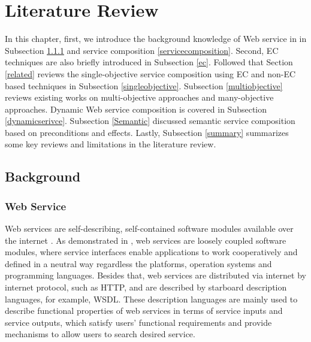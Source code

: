 \chapter{Literature Review}\label{C:review}
In this chapter, first, we introduce the background knowledge of Web service in in Subsection \ref{service} and service composition \ref{servicecomposition}. Second, EC techniques are also briefly introduced in Subsection \ref{ec}. Followed that Section \ref{related} reviews the single-objective service composition using EC and non-EC based techniques in Subsection \ref{singleobjective}.  Subsection  \ref{multiobjective} reviews existing works on multi-objective approaches and many-objective approaches.  Dynamic Web service composition is covered in Subsection \ref{dynamicserivce}. Subsection \ref{Semantic}  discussed semantic service composition based on preconditions and effects. Lastly, Subsection \ref{summary} summarizes some key reviews and limitations in the literature review.
\section{Background}\label{background}
\subsection{Web Service}\label{service}

Web services are self-describing, self-contained software modules available over the internet \cite{erl2004service}. As demonstrated in \cite{erl2004service}, web services are loosely coupled software modules, where service interfaces enable applications to work cooperatively and defined in a neutral way regardless the platforms, operation systems and programming languages. Besides that, web services are distributed via internet by internet protocol, such as HTTP, and are described by starboard description languages, for example, WSDL. These description languages are mainly used to describe functional properties of web services in terms of service inputs and service outputs, which satisfy users' functional requirements and provide mechanisms to allow users to search desired service. 

